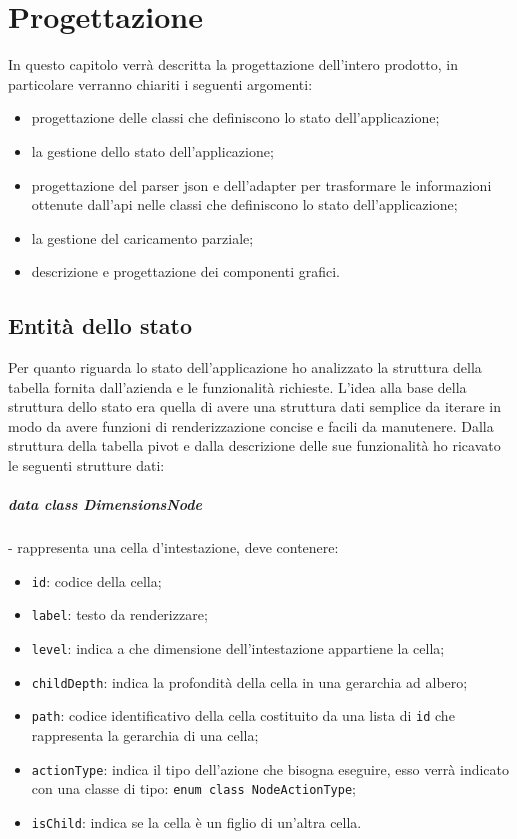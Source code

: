 
\chapter{Progettazione}
\label{cap:progettazione}

In questo capitolo verrà descritta la progettazione dell'intero prodotto, in particolare verranno chiariti i seguenti argomenti:
\begin{itemize}
	\item progettazione delle classi che definiscono lo stato dell'applicazione;
	\item la gestione dello stato dell'applicazione;
	\item progettazione del parser json e dell'adapter per trasformare le informazioni ottenute dall'api nelle classi che definiscono lo stato dell'applicazione;
	\item la gestione del caricamento parziale;
	\item descrizione e progettazione dei componenti grafici.
\end{itemize}

\section{Entità dello stato}
Per quanto riguarda lo stato dell'applicazione ho analizzato la struttura della tabella fornita dall'azienda e le funzionalità richieste. L'idea alla base della struttura dello stato era quella di avere una struttura dati semplice da iterare in modo da avere funzioni di renderizzazione concise e facili da manutenere. Dalla struttura della tabella pivot e dalla descrizione delle sue funzionalità ho ricavato le seguenti strutture dati:
\paragraph*{data class DimensionsNode}- rappresenta una cella d'intestazione, deve contenere:
\begin{itemize}
	\item \verb|id|: codice della cella;
	\item \verb|label|: testo da renderizzare;
	\item \verb|level|: indica a che dimensione dell'intestazione appartiene la cella;
	\item \verb|childDepth|: indica la profondità della cella in una gerarchia ad albero;
	\item \verb|path|: codice identificativo della cella costituito da una lista di \verb|id| che rappresenta la gerarchia di una cella;
	\item \verb|actionType|: indica il tipo dell'azione che bisogna eseguire, esso verrà indicato con una classe di tipo: \verb|enum class NodeActionType|;
	\item \verb|isChild|: indica se la cella è un figlio di un'altra cella.
\end{itemize}

